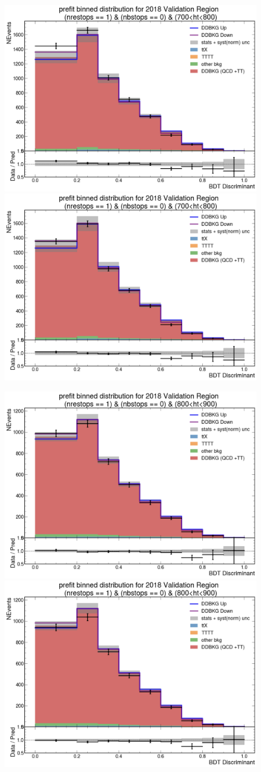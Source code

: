 \documentclass[twoside]{article}
\begin{document}
\begin{figure}[!t]
    \centering
    \includegraphics[width=.45\columnwidth]{plots/Trigger/TriggerReview/eff1.png}
    \includegraphics[width=.45\columnwidth]{plots/Trigger/TriggerReview/SF1.png}

    \includegraphics[width=.45\columnwidth]{plots/Trigger/TriggerReview/eff2.png}
    \includegraphics[width=.45\columnwidth]{plots/Trigger/TriggerReview/SF2.png}


\end{figure}
\end{document}
